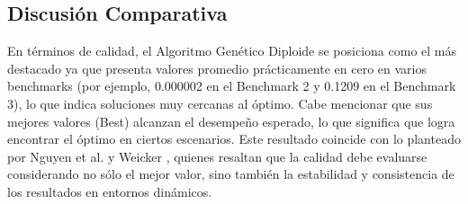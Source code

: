 \documentclass[10pt]{article}
\begin{document}



\subsection*{Discusión Comparativa}

En términos de calidad, el Algoritmo Genético Diploide se posiciona como el más destacado ya que presenta valores promedio prácticamente en cero en varios benchmarks (por ejemplo, 0.000002 en el Benchmark 2 y 0.1209 en el Benchmark 3), lo que indica soluciones muy cercanas al óptimo. Cabe mencionar que sus mejores valores (Best) alcanzan el desempeño esperado, lo que significa que logra encontrar el óptimo en ciertos escenarios. Este resultado coincide con lo planteado por Nguyen et al. \cite{nguyen2012survey} y Weicker \cite{weicker1999es}, quienes resaltan que la calidad debe evaluarse considerando no sólo el mejor valor, sino también la estabilidad y consistencia de los resultados en entornos dinámicos.
\end{document}
